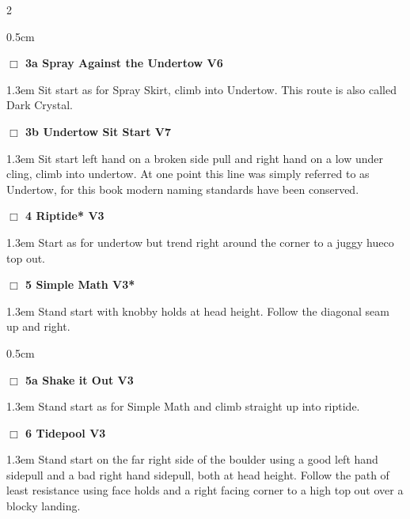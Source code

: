 \begin{multicols}{2}
\begin{adjustwidth}{0.5cm}{}				
\needspace{4em}
\needspace{2em}
\label{vr:Spray Against the Undertow}
\colorbox{RoyalBlue!20}{
\parbox{0.95\linewidth}{
\hspace{-1ex}\textbf{$\Box$
3a Spray Against the Undertow V6  
}}}
\begin{adjustwidth}{1.3em}{}			
Sit start as for Spray Skirt, climb into Undertow. This route is also called Dark Crystal.
\end{adjustwidth}
\needspace{2em}
\label{vr:Undertow Sit Start}
\colorbox{Goldenrod!20}{
\parbox{0.95\linewidth}{
\hspace{-1ex}\textbf{$\Box$
3b Undertow Sit Start V7  
}}}
\begin{adjustwidth}{1.3em}{}			
Sit start left hand on a broken side pull and right hand on a low under cling, climb into undertow. At one point this line was simply referred to as Undertow, for this book modern naming standards have been conserved.
\end{adjustwidth}
\end{adjustwidth}
\needspace{2em}
\label{rt:Riptide}
\colorbox{green!20}{
\parbox{0.95\linewidth}{
\hspace{-1ex}\textbf{$\Box$
4 Riptide* V3  
}}}
\begin{adjustwidth}{1.3em}{}			
Start as for undertow but trend right around the corner to a juggy hueco top out.
\end{adjustwidth}
\needspace{2em}
\label{rt:Simple Math}
\colorbox{green!20}{
\parbox{0.95\linewidth}{
\hspace{-1ex}\textbf{$\Box$
5 Simple Math V3*  
}}}
\begin{adjustwidth}{1.3em}{}			
Stand start with knobby holds at head height. Follow the diagonal seam up and right.
\end{adjustwidth}
\begin{adjustwidth}{0.5cm}{}				
\needspace{4em}
\needspace{2em}
\label{vr:Shake it Out}
\colorbox{green!20}{
\parbox{0.95\linewidth}{
\hspace{-1ex}\textbf{$\Box$
5a Shake it Out V3  
}}}
\begin{adjustwidth}{1.3em}{}			
Stand start as for Simple Math and climb straight up into riptide.
\end{adjustwidth}
\end{adjustwidth}
\needspace{2em}
\label{rt:Tidepool}
\colorbox{green!20}{
\parbox{0.95\linewidth}{
\hspace{-1ex}\textbf{$\Box$
6 Tidepool V3  \warn\warn
}}}
\begin{adjustwidth}{1.3em}{}			
Stand start on the far right side of the boulder using a good left hand sidepull and a bad right hand sidepull, both at head height. Follow the path of least resistance using face holds and a right facing corner to a high top out over a blocky landing.
\end{adjustwidth}
\needspace{10em}

\end{multicols}
